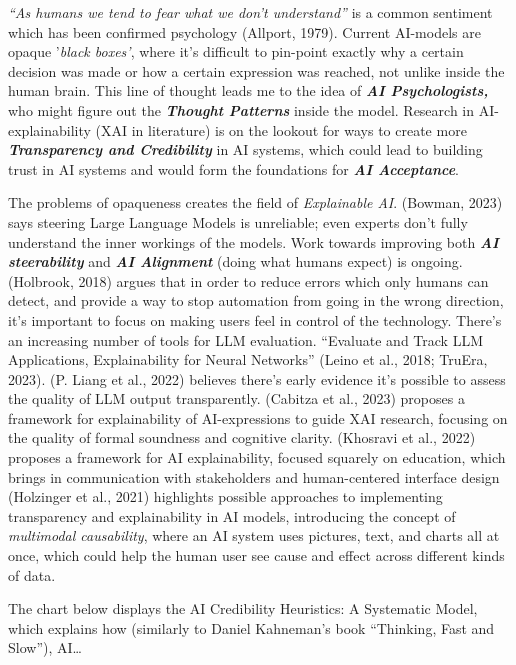 \documentclass[
  12pt,
  letterpaper,
  DIV=11,
  numbers=noendperiod]{scrartcl}
\begin{document}
\emph{``As humans we tend to fear what we don't understand''} is a
common sentiment which has been confirmed psychology (Allport, 1979).
Current AI-models are opaque '\emph{black boxes'}, where it's difficult
to pin-point exactly why a certain decision was made or how a certain
expression was reached, not unlike inside the human brain. This line of
thought leads me to the idea of \textbf{\emph{AI Psychologists,}} who
might figure out the \textbf{\emph{Thought Patterns}} inside the model.
Research in AI-explainability (XAI in literature) is on the lookout for
ways to create more \textbf{\emph{Transparency and Credibility}} in AI
systems, which could lead to building trust in AI systems and would form
the foundations for \textbf{\emph{AI Acceptance}}.

The problems of opaqueness creates the field of \emph{Explainable AI}.
(Bowman, 2023) says steering Large Language Models is unreliable; even
experts don't fully understand the inner workings of the models. Work
towards improving both \textbf{\emph{AI steerability}} and
\textbf{\emph{AI Alignment}} (doing what humans expect) is ongoing.
(Holbrook, 2018) argues that in order to reduce errors which only humans
can detect, and provide a way to stop automation from going in the wrong
direction, it's important to focus on making users feel in control of
the technology. There's an increasing number of tools for LLM
evaluation. ``Evaluate and Track LLM Applications, Explainability for
Neural Networks'' (Leino et al., 2018; TruEra, 2023). (P. Liang et al.,
2022) believes there's early evidence it's possible to assess the
quality of LLM output transparently. (Cabitza et al., 2023) proposes a
framework for explainability of AI-expressions to guide XAI research,
focusing on the quality of formal soundness and cognitive clarity.
(Khosravi et al., 2022) proposes a framework for AI explainability,
focused squarely on education, which brings in communication with
stakeholders and human-centered interface design (Holzinger et al.,
2021) highlights possible approaches to implementing transparency and
explainability in AI models, introducing the concept of \emph{multimodal
causability}, where an AI system uses pictures, text, and charts all at
once, which could help the human user see cause and effect across
different kinds of data.

The chart below displays the AI Credibility Heuristics: A Systematic
Model, which explains how (similarly to Daniel Kahneman's book
``Thinking, Fast and Slow''), AI\ldots{}
\end{document}
